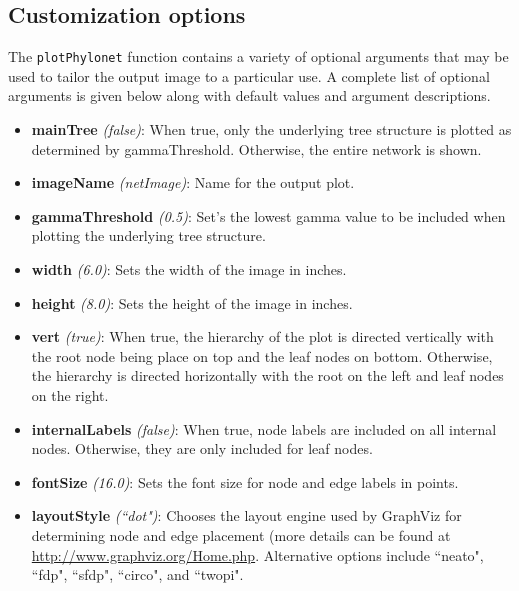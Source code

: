 \documentclass[12pt]{article}
\begin{document}
\subsection{Customization options}

The \texttt{plotPhylonet} function contains a variety of optional arguments that may be used to tailor the output image to a particular use.
A complete list of optional arguments is given below along with default values and argument descriptions.

\begin{itemize}
\item \textbf{mainTree} \textit{(false)}: When true, only the underlying tree structure is plotted as determined by gammaThreshold. Otherwise, the entire network is shown.

\item \textbf{imageName} \textit{(netImage)}: Name for the output plot.

\item \textbf{gammaThreshold} \textit{(0.5)}: Set's the lowest gamma value to be included when plotting the underlying tree structure.

\item \textbf{width} \textit{(6.0)}: Sets the width of the image in inches.

\item \textbf{height} \textit{(8.0)}: Sets the height of the image in inches.

\item \textbf{vert} \textit{(true)}: When true, the hierarchy of the plot is directed vertically with the root node being place on top and the leaf nodes on bottom.
  Otherwise, the hierarchy is directed horizontally with the root on the left and leaf nodes on the right.

\item \textbf{internalLabels} \textit{(false)}: When true, node labels are included on all internal nodes. Otherwise, they are only included for leaf nodes.

\item \textbf{fontSize} \textit{(16.0)}: Sets the font size for node and edge labels in points.

\item \textbf{layoutStyle} \textit{(``dot")}: Chooses the layout engine used by GraphViz for determining node and edge placement (more details can be found at \url{http://www.graphviz.org/Home.php}.	        							 	     Alternative options include ``neato", ``fdp", ``sfdp", ``circo", and ``twopi".


\end{itemize}
\end{document}
